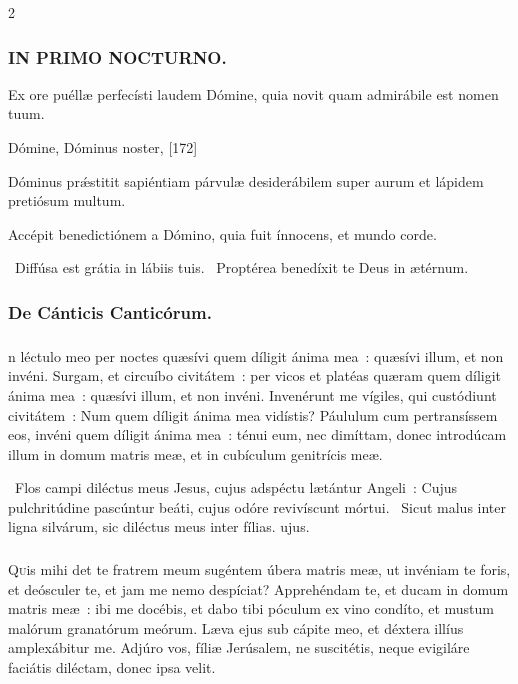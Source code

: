 \documentclass[9pt,twoside]{extarticle}
\begin{document}
\begin{multicols}{2}
{{{\subsubsection*{\center \textsc{IN PRIMO NOCTURNO.}}
\begin{tightlist}{}
\item {} Ex ore puéllæ perfecísti laudem Dómine, quia novit quam admirábile est nomen tuum.
\item {} Dómine, Dóminus noster,  [172]
\item {} Dóminus prǽstitit sapiéntiam párvulæ desiderábilem super aurum et lápidem pretiósum multum.
\item {} Accépit benedictiónem a Dómino, quia fuit ínnocens, et mundo corde.
\item {}~Diffúsa est grátia in lábiis tuis. ~Proptérea benedíxit te Deus in ætérnum.
\item {}
\end{tightlist}

\subsubsection*{\center De Cánticis Canticórum.}
\subsubsection*{\center {}}
n léctulo meo per noctes quæsívi quem díligit ánima mea~: quæsívi illum, et non invéni. Surgam, et circuíbo civitátem~: per vicos et platéas quæram quem díligit ánima mea~: quæsívi illum, et non invéni. Invenérunt me vígiles, qui custódiunt civitátem~: Num quem díligit ánima mea vidístis? Páululum cum pertransíssem eos, invéni quem díligit ánima mea~: ténui eum, nec dimíttam, donec introdúcam illum in domum matris meæ, et in cubículum genitrícis meæ.

\begin{tightlist}{}
\item {}~Flos campi diléctus meus Jesus, cujus adspéctu lætántur Angeli~: \textred{*} Cujus pulchritúdine pascúntur beáti, cujus odóre revivíscunt mórtui. ~Sicut malus inter ligna silvárum, sic diléctus meus inter fílias. ujus.
\end{tightlist}

\subsubsection*{\center {}}
\lettrine{Q}uis mihi det te fratrem meum sugéntem úbera matris meæ, ut invéniam te foris, et deósculer te, et jam me nemo despíciat? Apprehéndam te, et ducam in domum matris meæ~: ibi me docébis, et dabo tibi póculum ex vino condíto, et mustum malórum granatórum meórum. Læva ejus sub cápite meo, et déxtera illíus amplexábitur me. Adjúro vos, fíliæ Jerúsalem, ne suscitétis, neque evigiláre faciátis diléctam, donec ipsa velit.

}}}
\end{multicols}
\end{document}
